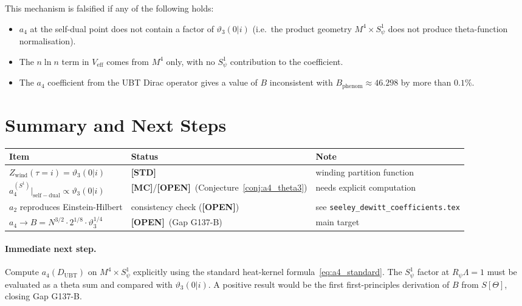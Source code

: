 \documentclass[12pt,a4paper]{article}
\theoremstyle{remark}
\newcommand{\STD}{\textbf{[STD]}}
\newcommand{\MC}{\textbf{[MC]}}
\newcommand{\OPEN}{\textbf{[OPEN]}}
\begin{document}
This mechanism is falsified if any of the following holds:

\begin{itemize}
  \item $a_4$ at the self-dual point does not contain a factor of $\vartheta_3(0|i)$
    (i.e.\ the product geometry $M^4\times S^1_\psi$ does not produce
    theta-function normalisation).

  \item The $n\ln n$ term in $V_{\mathrm{eff}}$ comes from $M^4$ only, with no
    $S^1_\psi$ contribution to the coefficient.

  \item The $a_4$ coefficient from the UBT Dirac operator gives a value of $B$
    inconsistent with $B_{\mathrm{phenom}}\approx 46.298$ by more than $0.1\%$.
\end{itemize}

\section{Summary and Next Steps}
\label{sec:summary}

\begin{tcolorbox}[colback=green!4!white, colframe=green!55!black,
  title={Result summary}]
\begin{center}
\begin{tabular}{lll}
\toprule
\textbf{Item} & \textbf{Status} & \textbf{Note} \\
\midrule
$Z_{\mathrm{wind}}(\tau=i) = \vartheta_3(0|i)$ & \STD & winding partition function \\
$a_4^{(S^1)}|_{\mathrm{self-dual}} \propto \vartheta_3(0|i)$ &
  \MC/\OPEN\ (Conjecture~\ref{conj:a4_theta3}) & needs explicit computation \\
$a_2$ reproduces Einstein-Hilbert & consistency check (\OPEN) &
  see \texttt{seeley\_dewitt\_coefficients.tex} \\
$a_4 \to B = N^{3/2}\cdot 2^{1/8}\cdot\vartheta_3^{1/4}$ &
  \OPEN\ (Gap G137-B) & main target \\
\bottomrule
\end{tabular}
\end{center}
\end{tcolorbox}

\paragraph{Immediate next step.}
Compute $a_4(D_{\mathrm{UBT}})$ on $M^4\times S^1_\psi$ explicitly using
the standard heat-kernel formula~\eqref{eq:a4_standard}.
The $S^1_\psi$ factor at $R_\psi\Lambda=1$ must be evaluated as a theta sum
and compared with $\vartheta_3(0|i)$.
A positive result would be the first first-principles derivation of
$B$ from $S[\Theta]$, closing Gap G137-B.
\end{document}
